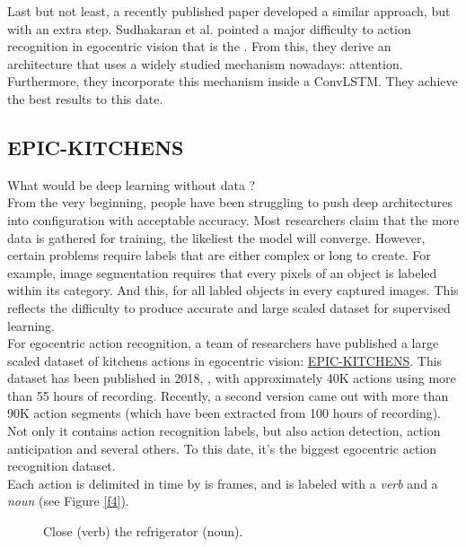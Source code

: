 \documentclass[12pt, a4paper]{report}
\begin{document}
				Last but not least, a recently published paper developed a similar approach, but with an extra step.
				Sudhakaran et al. \cite{sudhakaran} pointed a major difficulty to action recognition in egocentric vision that is the .
				From this, they derive an architecture that uses a widely studied mechanism nowadays: attention.
				Furthermore, they incorporate this mechanism inside a ConvLSTM.  %
				They achieve the best results to this date.

			\subsection{EPIC-KITCHENS}\label{epic_kitchen}
				What would be deep learning without data ?\\
				From the very beginning, people have been struggling to push deep architectures into configuration with acceptable accuracy.
				Most researchers claim that the more data is gathered for training, the likeliest the model will converge.
				However, certain problems require labels that are either complex or long to create.
				For example, image segmentation requires that every pixels of an object is labeled within its category.
				And this, for all labled objects in every captured images.
				This reflects the difficulty to produce accurate and large scaled dataset for supervised learning.\\
				
				For egocentric action recognition, a team of researchers have published a large scaled dataset of kitchens actions in egocentric vision: \href{https://epic-kitchens.github.io/2021}{EPIC-KITCHENS}.
				This dataset has been published in 2018, \cite{damen_18}, with approximately 40K actions using more than 55 hours of recording.
				Recently, a second version came out with more than 90K action segments (which have been extracted from 100 hours of recording).
				Not only it contains action recognition labels, but also action detection, action anticipation and several others.
				To this date, it's the biggest egocentric action recognition dataset.\\

				Each action is delimited in time by is frames, and is labeled with a {\itshape verb} and a {\itshape noun} (see Figure \ref{f4}).
				\begin{figure}[!tbp]
					\centering
					\caption{Close ({\small verb}) the refrigerator ({\small noun}).}
				\end{figure}
\end{document}

